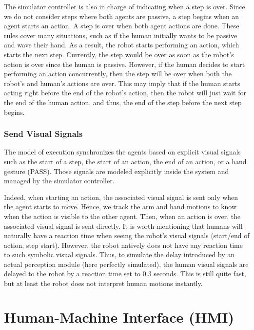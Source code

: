 The simulator controller is also in charge of indicating when a step is over. Since we do not consider steps where both agents are passive, a step begins when an agent starts an action. A step is over when both agent actions are done. These rules cover many situations, such as if the human initially wants to be passive and wave their hand. As a result, the robot starts performing an action, which starts the next step. Currently, the step would be over as soon as the robot's action is over since the human is passive. However, if the human decides to start performing an action concurrently, then the step will be over when both the robot's and human's actions are over. This may imply that if the human starts acting right before the end of the robot's action, then the robot will just wait for the end of the human action, and thus, the end of the step before the next step begins.  

\subsubsection{Send Visual Signals}

The model of execution synchronizes the agents based on explicit visual signals such as the start of a step, the start of an action, the end of an action, or a hand gesture (PASS). Those signals are modeled explicitly inside the system and managed by the simulator controller.

Indeed, when starting an action, the associated visual signal is sent only when the agent starts to move. Hence, we track the arm and hand motions to know when the action is visible to the other agent. Then, when an action is over, the associated visual signal is sent directly. It is worth mentioning that humans will naturally have a reaction time when seeing the robot's visual signals (start/end of action, step start). However, the robot natively does not have any reaction time to such symbolic visual signals. Thus, to simulate the delay introduced by an actual perception module (here perfectly simulated), the human visual signals are delayed to the robot by a reaction time set to 0.3 seconds. This is still quite fast, but at least the robot does not interpret human motions instantly.   




\section{Human-Machine Interface (HMI)}

